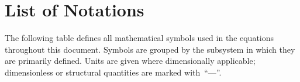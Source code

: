 \documentclass[12pt, a4paper]{report}
\begin{document}
\acuseall %
\printacronyms
\newpage

\chapter*{List of Notations}

\noindent The following table defines all mathematical symbols used in the equations throughout this document. Symbols are grouped by the subsystem in which they are primarily defined. Units are given where dimensionally applicable; dimensionless or structural quantities are marked with~``---''.

\vspace{0.8em}
\end{document}
